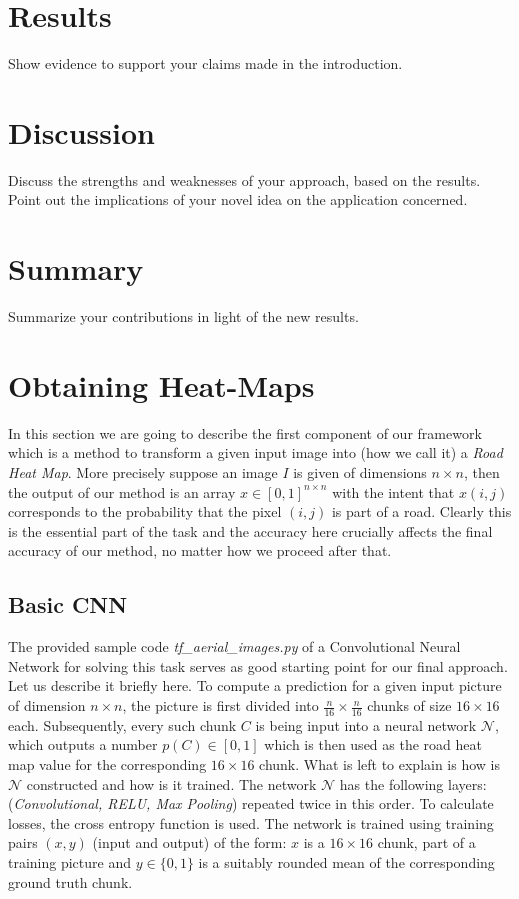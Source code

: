 \documentclass[10pt,conference,compsocconf]{IEEEtran}
\newcommand{\cN}{\mathcal{N}}
\begin{document}
\section{Results} 
  Show evidence to support your claims made in the
  introduction.
\section{Discussion}
  Discuss the strengths and weaknesses of your
  approach, based on the results. Point out the implications of your
  novel idea on the application concerned.
\section{Summary}
  Summarize your contributions in light of the new
  results.
  
\section{Obtaining Heat-Maps}
In this section we are going to describe the first component of our framework which is a method to transform a given input image into (how we call it) a {\it Road Heat Map}. More precisely suppose an image $I$ is given of dimensions $n\times n$, then the output of our method is an array $x\in [0,1]^{n\times n}$ with the intent that $x(i,j)$ corresponds to the probability that the pixel $(i,j)$ is part of a road. Clearly this is the essential part of the task and the accuracy here crucially affects the final accuracy of our method, no matter how we proceed after that. 

\subsection{Basic CNN}
The provided sample code {\it tf\_aerial\_images.py} of a Convolutional Neural Network for solving this task serves as good starting point for our final approach. Let us describe it briefly here. To compute a prediction for a given input picture of dimension $n\times n$, the picture is first divided into $\frac{n}{16} \times \frac{n}{16}$ chunks of size $16 \times 16$ each. Subsequently, every such chunk $C$ is being input into a neural network $\cN$, which outputs a number $p(C) \in [0,1]$ which is then used as the road heat map value for the corresponding $16\times 16$ chunk. What is left to explain is how is $\cN$ constructed and how is it trained. The network $\cN$ has the following layers: (\textit{Convolutional, RELU, Max Pooling}) repeated twice in this order. To calculate  losses, the cross entropy function is used. The network  is trained using training pairs $(x,y)$ (input and output) of the form: $x$ is a $16\times 16$ chunk, part of a training picture and $y \in \{0,1\}$ is a suitably rounded mean of the corresponding ground truth chunk.  
\end{document}
